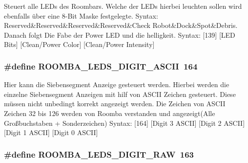 Steuert alle L\-E\-Ds des Roombars. Welche der L\-E\-Ds hierbei leuchten sollen wird ebenfalls über eine 8-\/\-Bit Maske festgelegte. Syntax\-: Reserved\&Reserved\&Reserved\&Reserved\&Check Robot\&Dock\&Spot\&Debris. Danach folgt Die Fabe der Power L\-E\-D und die helligkeit. Syntax\-: \mbox{[}139\mbox{]} \mbox{[}L\-E\-D Bits\mbox{]} \mbox{[}Clean/\-Power Color\mbox{]} \mbox{[}Clean/\-Power Intensity\mbox{]} \hypertarget{group__roomba__commands__motor_ga72bfc393689d5c9aa839df84e21888f7}{
\subsubsection[{R\-O\-O\-M\-B\-A\-\_\-\-L\-E\-D\-S\-\_\-\-D\-I\-G\-I\-T\-\_\-\-A\-S\-C\-I\-I}]{\setlength{\rightskip}{0pt plus 5cm}\#define R\-O\-O\-M\-B\-A\-\_\-\-L\-E\-D\-S\-\_\-\-D\-I\-G\-I\-T\-\_\-\-A\-S\-C\-I\-I~164}}\label{group__roomba__commands__motor_ga72bfc393689d5c9aa839df84e21888f7}
Hier kann die Siebensegment Anzeige gesteuert werden. Hierbei werden die einzelne Siebensegment Anzeigen mit hilf von A\-S\-C\-I\-I Zeichen gesteuert. Diese müssen nicht unbedingt korrekt angezeigt werden. Die Zeichen von A\-S\-C\-I\-I Zeichen 32 bis 126 werden von Roomba verstanden und angezeigt(Alle Großbuchstaben + Sonderzeichen) Syntax\-: \mbox{[}164\mbox{]} \mbox{[}Digit 3 A\-S\-C\-I\-I\mbox{]} \mbox{[}Digit 2 A\-S\-C\-I\-I\mbox{]} \mbox{[}Digit 1 A\-S\-C\-I\-I\mbox{]} \mbox{[}Digit 0 A\-S\-C\-I\-I\mbox{]} \hypertarget{group__roomba__commands__motor_ga1ea5e809eb83d4bf5dd6a6f33dabffae}{
\subsubsection[{R\-O\-O\-M\-B\-A\-\_\-\-L\-E\-D\-S\-\_\-\-D\-I\-G\-I\-T\-\_\-\-R\-A\-W}]{\setlength{\rightskip}{0pt plus 5cm}\#define R\-O\-O\-M\-B\-A\-\_\-\-L\-E\-D\-S\-\_\-\-D\-I\-G\-I\-T\-\_\-\-R\-A\-W~163}}\label{group__roomba__commands__motor_ga1ea5e809eb83d4bf5dd6a6f33dabffae}
